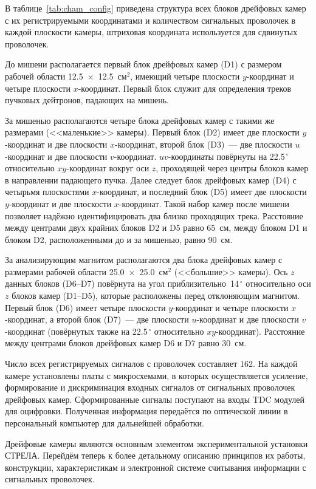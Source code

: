 В таблице~\ref{tab:cham_config} приведена структура всех блоков дрейфовых камер
с их регистрируемыми координатами и количеством сигнальных проволочек в каждой
плоскости камеры, штриховая координата используется для сдвинутых проволочек.


До мишени располагается первый блок дрейфовых камер (D1) с размером рабочей
области 12.5~$\times$~12.5~см$^2$, имеющий четыре плоскости $y$-координат и
четыре плоскости $x$-координат. Первый блок служит для определения треков
пучковых дейтронов, падающих на мишень.

За мишенью располагаются четыре блока дрейфовых камер с такими же размерами
(<<маленькие>> камеры). Первый блок (D2) имеет две плоскости $y$-координат и две
плоскости $x$-координат, второй блок (D3)~--- две плоскости $u$-координат и две
плоскости $v$-координат. $uv$-координаты повёрнуты на 22.5$^{\,\circ}$
относительно $xy$-координат вокруг оси $z$, проходящей через центры блоков камер
в направлении падающего пучка. Далее следует блок дрейфовых камер (D4) с
четырьмя плоскостями $x$-координат, и последний блок (D5) имеет две плоскости
$y$-координат и две плоскости $x$-координат. Такой набор камер после мишени
позволяет надёжно идентифицировать два близко проходящих трека. Расстояние между
центрами двух крайних блоков D2 и D5 равно 65~см, между блоком D1 и блоком D2,
расположенными до и за мишенью, равно 90~см.

За анализирующим магнитом располагаются два блока дрейфовых камер с размерами
рабочей области 25.0~$\times$~25.0~см$^2$ (<<большие>> камеры). Ось $z$ данных
блоков (D6--D7) повёрнута на угол приблизительно~14$^{\,\circ}$ относительно оси
$z$ блоков камер (D1--D5), которые расположены перед отклоняющим магнитом.
Первый блок (D6) имеет четыре плоскости $y$-координат и четыре плоскости
$x$-координат, а второй блок (D7)~--- две плоскости $u$-координат и две
плоскости $v$-координат (повёрнутых также на 22.5$^{\,\circ}$ относительно
$xy$-координат). Расстояние между центрами блоков дрейфовых камер D6 и D7 равно
30~см.

Число всех регистрируемых сигналов с проволочек составляет 162. На каждой камере
установлены платы с микросхемами, в которых осуществляется усиление,
формирование и дискриминация входных сигналов от сигнальных проволочек дрейфовых
камер. Сформированные сигналы поступают на входы TDC модулей для оцифровки.
Полученная информация передаётся по оптической линии в персональный компьютер
для дальнейшей обработки.

Дрейфовые камеры являются основным элементом \! экспериментальной установки
СТРЕЛА. Перейдём теперь к более детальному описанию принципов их работы,
конструкции, характеристикам и электронной системе считывания информации с
сигнальных проволочек.


